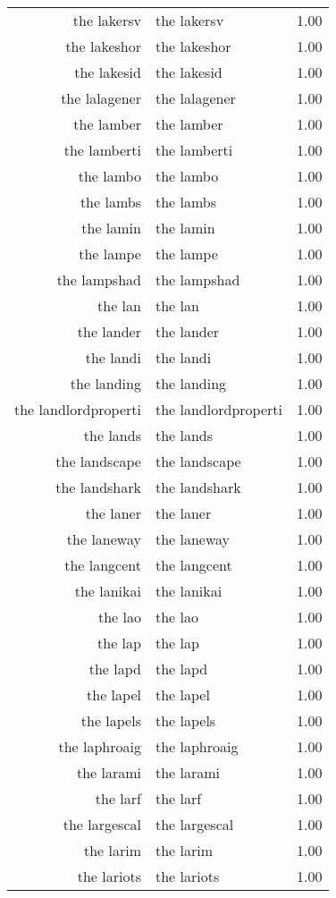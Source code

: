\begin{table}[ht]
\begin{tabular}{rlr}
  the lakersv & the lakersv & 1.00 \\ 
  the lakeshor & the lakeshor & 1.00 \\ 
  the lakesid & the lakesid & 1.00 \\ 
  the lalagener & the lalagener & 1.00 \\ 
  the lamber & the lamber & 1.00 \\ 
  the lamberti & the lamberti & 1.00 \\ 
  the lambo & the lambo & 1.00 \\ 
  the lambs & the lambs & 1.00 \\ 
  the lamin & the lamin & 1.00 \\ 
  the lampe & the lampe & 1.00 \\ 
  the lampshad & the lampshad & 1.00 \\ 
  the lan & the lan & 1.00 \\ 
  the lander & the lander & 1.00 \\ 
  the landi & the landi & 1.00 \\ 
  the landing & the landing & 1.00 \\ 
  the landlordproperti & the landlordproperti & 1.00 \\ 
  the lands & the lands & 1.00 \\ 
  the landscape & the landscape & 1.00 \\ 
  the landshark & the landshark & 1.00 \\ 
  the laner & the laner & 1.00 \\ 
  the laneway & the laneway & 1.00 \\ 
  the langcent & the langcent & 1.00 \\ 
  the lanikai & the lanikai & 1.00 \\ 
  the lao & the lao & 1.00 \\ 
  the lap & the lap & 1.00 \\ 
  the lapd & the lapd & 1.00 \\ 
  the lapel & the lapel & 1.00 \\ 
  the lapels & the lapels & 1.00 \\ 
  the laphroaig & the laphroaig & 1.00 \\ 
  the larami & the larami & 1.00 \\ 
  the larf & the larf & 1.00 \\ 
  the largescal & the largescal & 1.00 \\ 
  the larim & the larim & 1.00 \\ 
  the lariots & the lariots & 1.00 \\ 

\end{tabular}
\end{table}
